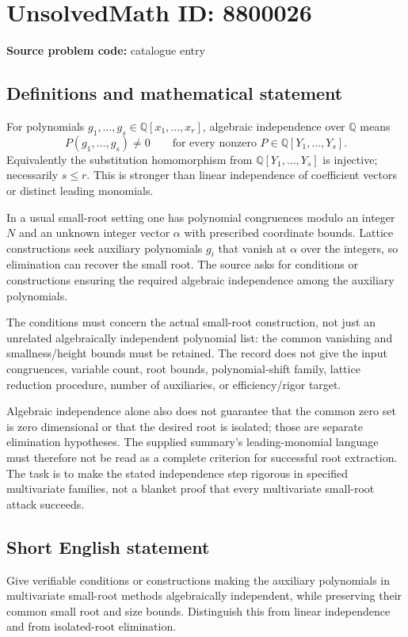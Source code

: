\documentclass[11pt]{article}
\newcommand{\Q}{\mathbb{Q}}
\begin{document}
\section*{UnsolvedMath ID: 8800026}
\textbf{Source problem code:} catalogue entry
\subsection{Definitions and mathematical statement}
For polynomials $g_1,\ldots,g_s\in\Q[x_1,\ldots,x_r]$, algebraic independence over $\Q$ means
\[
P(g_1,\ldots,g_s)\ne0\qquad\text{for every nonzero }P\in\Q[Y_1,\ldots,Y_s].
\]
Equivalently the substitution homomorphism from $\Q[Y_1,\ldots,Y_s]$ is injective; necessarily $s\leq r$. This is stronger than linear independence of coefficient vectors or distinct leading monomials.

In a usual small-root setting one has polynomial congruences modulo an integer $N$ and an unknown integer vector $\alpha$ with prescribed coordinate bounds. Lattice constructions seek auxiliary polynomials $g_i$ that vanish at $\alpha$ over the integers, so elimination can recover the small root. The source asks for conditions or constructions ensuring the required algebraic independence among the auxiliary polynomials.

The conditions must concern the actual small-root construction, not just an unrelated algebraically independent polynomial list: the common vanishing and smallness/height bounds must be retained. The record does not give the input congruences, variable count, root bounds, polynomial-shift family, lattice reduction procedure, number of auxiliaries, or efficiency/rigor target.

Algebraic independence alone also does not guarantee that the common zero set is zero dimensional or that the desired root is isolated; those are separate elimination hypotheses. The supplied summary's leading-monomial language must therefore not be read as a complete criterion for successful root extraction. The task is to make the stated independence step rigorous in specified multivariate families, not a blanket proof that every multivariate small-root attack succeeds.
\subsection{Short English statement}
Give verifiable conditions or constructions making the auxiliary polynomials in multivariate small-root methods algebraically independent, while preserving their common small root and size bounds. Distinguish this from linear independence and from isolated-root elimination.
\end{document}
